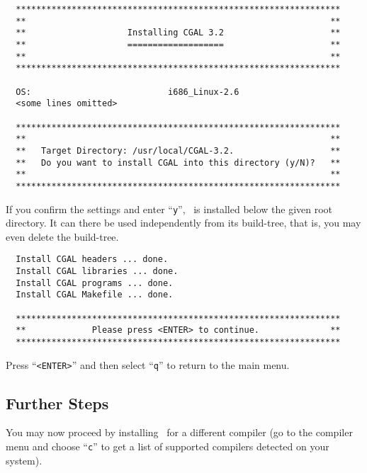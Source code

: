 {\ccTexHtml{\scriptsize}{}
\begin{verbatim}
  ****************************************************************
  **                                                            **
  **                    Installing CGAL 3.2                     **
  **                    ===================                     **
  **                                                            **
  ****************************************************************

  OS:                           i686_Linux-2.6
  <some lines omitted>

  ****************************************************************
  **                                                            **
  **   Target Directory: /usr/local/CGAL-3.2.                   **
  **   Do you want to install CGAL into this directory (y/N)?   **
  **                                                            **
  ****************************************************************
\end{verbatim}
}

If you confirm the settings and enter ``\texttt{y}'', \cgal\ is
installed below the given root directory. It can there be used
independently from its build-tree, that is, you may even delete the
build-tree.

{\ccTexHtml{\scriptsize}{}
\begin{verbatim}
  Install CGAL headers ... done.
  Install CGAL libraries ... done.
  Install CGAL programs ... done.
  Install CGAL Makefile ... done.

  ****************************************************************
  **             Please press <ENTER> to continue.              **
  ****************************************************************
\end{verbatim}
}

Press ``\texttt{<ENTER>}'' and then select ``\texttt{q}'' to return to
the main menu.

\subsection{Further Steps\label{sec:further}}

You may now proceed by installing \cgal\ for a different compiler (go
to the compiler menu and choose ``\texttt{c}'' to get a list of
supported compilers detected on your system).

